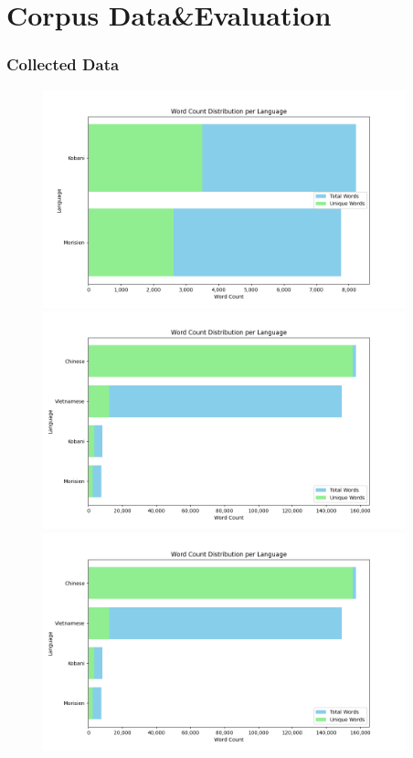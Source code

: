 \documentclass[aspectratio=169]{beamer}
\begin{document}
\section{Corpus Data\&Evaluation}

\begin{frame}[fragile]
	\frametitle{Collected Data}
    \centering
    \hfill\begin{figure}
        \begin{overprint}
        \centering
             \includegraphics[height=6.3cm]{images/mtacr-2024-april.png} 
             \includegraphics[height=6.3cm]{images/mtacr-2024-april-targets.png} 
             \includegraphics[height=6.3cm]{images/mtacr-2024-april-targets.png}  

\end{overprint}
\end{figure}
\end{frame}
\end{document}
